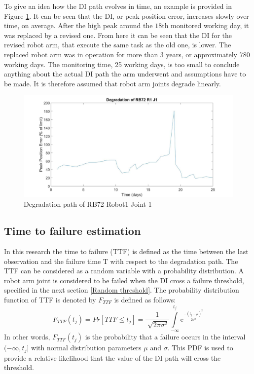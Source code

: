 To give an idea how the DI path evolves in time, an example is provided in Figure \ref{fig:RB72R1J1Degradation}. It can be seen that the DI, or peak position error, increases slowly over time, on average. After the high peak around the $18$th monitored working day, it was replaced by a revised one. From here it can be seen that the DI for the revised robot arm, that execute the same task as the old one, is lower. The replaced robot arm was in operation for more than 3 years, or approximately 780 working days. The monitoring time, 25 working days, is too small to conclude anything about the actual DI path the arm underwent and assumptions have to be made. It is therefore assumed that robot arm joints degrade linearly.
\begin{figure}[ht]
\centering
\includegraphics[width=\textwidth]{Figures/RB72R1J1Degradation}
\caption[Degradation path of RB72 Robot1 Joint 1]{Degradation path of RB72 Robot1 Joint 1} \label{fig:RB72R1J1Degradation}
\end{figure}

\subsection{Time to failure estimation} \label{TTF}
In this research the time to failure (TTF) is defined as the time between the last observation and the failure time T with respect to the degradation path. The TTF can be considered as a random variable with a probability distribution. A robot arm joint is considered to be failed when the DI cross a failure threshold, specified in the next section \ref{Random threshold}. The probability distribution function of TTF is denoted by $F_{TTF}$ is defined as follows:
\begin{equation} \label{eq:TTFeq:TTF}
F_{TTF}(t_j)=Pr[TTF \leq t_j] = \frac{1}{\sqrt[]{2\pi\sigma^2}} \int\limits_{-\infty}^{t_j} \mathrm{e}^{\frac{-(t_j-\mu)^2}{2\sigma^2}}
\end{equation}
In other words, $F_{TTF}(t_j)$ is the probability that a failure occurs in the interval $(-\infty,t_j]$ with normal distribution parameters $\mu$ and $\sigma$. This PDF is used to provide a relative likelihood that the value of the DI path will cross the threshold. 

